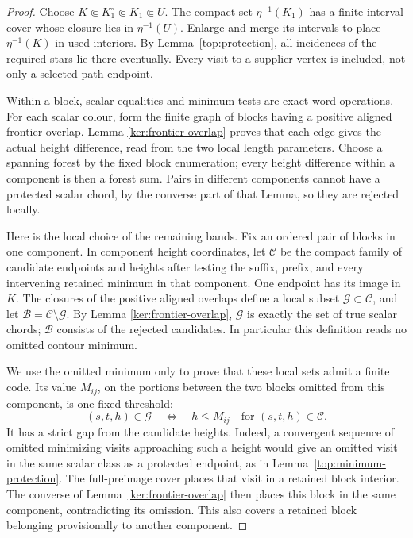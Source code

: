 \documentclass[11pt]{article}
\numberwithin{equation}{section}
\theoremstyle{definition}
\theoremstyle{remark}
\newcommand{\1}{\mathbf 1}
\begin{document}
\begin{proof}
Choose \(K\Subset K_1^\circ\Subset K_1\Subset U\).
The compact set \(\eta^{-1}(K_1)\) has a finite interval cover whose
closure lies in \(\eta^{-1}(U)\).  Enlarge and merge its intervals to
place \(\eta^{-1}(K)\) in used interiors.  By Lemma~\ref{top:protection}, all
incidences of the required stars lie there eventually.  Every visit
to a supplier vertex is included, not only a selected path endpoint.

Within a block, scalar equalities and minimum tests are exact word
operations.  For each scalar colour, form the finite graph of blocks
having a positive aligned frontier overlap.  Lemma
\ref{ker:frontier-overlap} proves that each edge gives the actual
height difference, read from the two local length parameters.
Choose a spanning forest by the fixed block enumeration; every
height difference within a component is then a forest sum.
Pairs in different components cannot have a protected scalar chord,
by the converse part of that Lemma, so they are rejected locally.

Here is the local choice of the remaining bands.  Fix an ordered
pair of blocks in one component.  In component height coordinates,
let \(\mathcal C\) be the compact family of candidate endpoints and
heights after testing the suffix, prefix, and every intervening
retained minimum in that component.  One endpoint has its image
in \(K\).  The closures of the positive aligned overlaps define a
local subset \(\mathcal G\subset\mathcal C\), and let
\(\mathcal B=\mathcal C\setminus\mathcal G\).  By Lemma
\ref{ker:frontier-overlap}, \(\mathcal G\) is exactly the set of true
scalar chords; \(\mathcal B\) consists of the rejected candidates.
In particular this definition reads no omitted contour minimum.

We use the omitted minimum only to prove that these local sets admit
a finite code.  Its value \(M_{ij}\), on the portions between the two
blocks omitted from this component, is one fixed threshold:
\[
 (s,t,h)\in\mathcal G\quad\Longleftrightarrow\quad h\le M_{ij}
 \quad\text{for }(s,t,h)\in\mathcal C.
\]
It has a strict gap from the candidate heights.  Indeed, a convergent
sequence of omitted minimizing visits approaching such a height
would give an omitted visit in the same scalar class as a protected
endpoint, as in Lemma~\ref{top:minimum-protection}.  The full-preimage
cover places that visit in a retained block interior.  The converse
of Lemma~\ref{ker:frontier-overlap} then places this block in the same
component, contradicting its omission.  This also covers a retained
block belonging provisionally to another component.


\end{proof}
\end{document}
